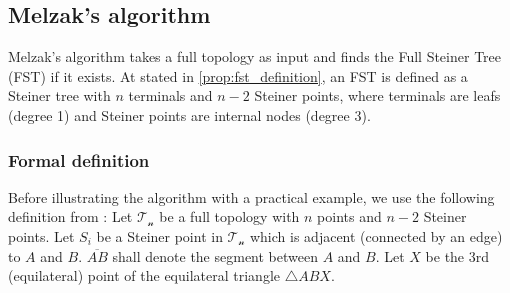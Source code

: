 \documentclass{l4proj}
\begin{document}
\subsection{Melzak's algorithm}
\label{sec:melzak_algo}
Melzak's algorithm takes a full topology as input and finds the Full Steiner Tree (FST) if it exists. At stated in \ref{prop:fst_definition}, an FST is defined as a Steiner tree with $n$ terminals and $n-2$ Steiner points, where terminals are leafs (degree 1) and Steiner points are internal nodes (degree 3).

\subsubsection{Formal definition}
Before illustrating the algorithm with a practical example, we use the following definition from \citep{Brazil2015}:
Let $\mathcal{T_n}$ be a full topology with $n$ points and $n - 2$ Steiner points. Let $S_i$ be a Steiner point in $\mathcal{T_n}$ which is adjacent (connected by an edge) to $A$ and $B$. $\overline{AB}$ shall denote the segment between $A$ and $B$. Let $X$ be the 3rd (equilateral) point of the equilateral triangle $\triangle ABX$.
\end{document}
